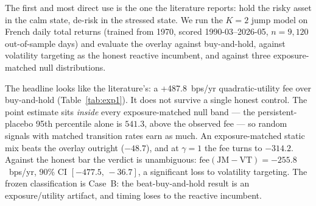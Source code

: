 \documentclass[11pt]{article}
\newcommand{\aidraft}[1]{{\color{aidraftcolor}#1}} %
\newcommand{\aidraft}[1]{#1}
\newcommand{\overlapDays}{9{,}120}
\newcommand{\feeJMBH}{+487.8}
\newcommand{\feeJMVT}{-255.8}
\newcommand{\feeJMVTci}{[-477.5,\,-36.7]}
\newcommand{\feeJMBHgone}{-314.2}    %
\newcommand{\feeStaticMix}{-48.7}
\newcommand{\placeboOne}{541.3}      %
\begin{document}
\aidraft{%
The first and most direct use is the one the literature reports: hold the risky asset in the calm
state, de-risk in the stressed state.
We run the $K{=}2$ jump model on French daily total returns (trained from 1970, scored
1990-03--2026-05, $n{=}\overlapDays{}$ out-of-sample days) and evaluate the overlay against
buy-and-hold, against volatility targeting as the honest reactive incumbent, and against three
exposure-matched null distributions.%
}

\aidraft{%
The headline looks like the literature's: a \feeJMBH{}~bps/yr quadratic-utility fee over
buy-and-hold (Table~\ref{tab:exp1}).
It does not survive a single honest control.
The point estimate sits \emph{inside} every exposure-matched null band --- the persistent-placebo
95th percentile alone is $\placeboOne$, above the observed fee --- so random signals with matched
transition rates earn as much.
An exposure-matched static mix beats the overlay outright ($\feeStaticMix$), and at $\gamma{=}1$ the
fee turns to $\feeJMBHgone$.
Against the honest bar the verdict is unambiguous: $\text{fee}(\text{JM}-\text{VT}) = \feeJMVT$~bps/yr,
90\% CI $\feeJMVTci$, a significant loss to volatility targeting.
The frozen classification is Case~B: the beat-buy-and-hold result is an exposure/utility artifact,
and timing loses to the reactive incumbent.%
}
\end{document}
